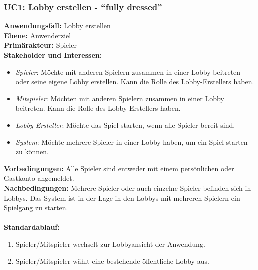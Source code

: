 \documentclass[11pt,ngerman]{article}
\newcommand{\quotes}[1]{``#1''}
\begin{document}
       \subsubsection{UC1: Lobby erstellen - \quotes{fully dressed}}
            \begin{tcolorbox}[enhanced, breakable, sharp corners, width=\dimexpr\textwidth-15mm\relax ,enlarge left by=10mm ,fontupper=\linespread{1.1}\selectfont, boxrule=1pt, title={UC1: Lobby erstellen}, colback=white, colframe=gray!22, coltitle=black]

                \textbf{Anwendungsfall:} Lobby erstellen \\
                \textbf{Ebene:} Anwenderziel \\
                \textbf{Primärakteur:} Spieler \\
                \textbf{Stakeholder und Interessen:}
                \begin{itemize}
                    \item \textit{Spieler}: Möchte mit anderen Spielern zusammen in einer \Gls{Lobby} beitreten oder seine eigene \Gls{Lobby} erstellen. Kann die Rolle des Lobby-Erstellers haben.
                    \item \textit{Mitspieler}: Möchten mit anderen Spielern zusammen in einer \Gls{Lobby} beitreten. Kann die Rolle des Lobby-Erstellers haben.
                    \item \textit{Lobby-Ersteller}:  Möchte das Spiel starten, wenn alle Spieler bereit sind.
                    \item \textit{System}: Möchte mehrere Spieler in einer \Gls{Lobby} haben, um ein Spiel starten zu können.
                \end{itemize}
                \textbf{Vorbedingungen:} Alle Spieler sind entweder mit einem persönlichen oder Gastkonto angemeldet.\\
                \textbf{Nachbedingungen:} Mehrere Spieler oder auch einzelne Spieler befinden sich in \Glspl{Lobby}. Das System ist in der Lage in den \Glspl{Lobby} mit mehreren Spielern ein Spielgang zu starten. \\
                \\  \textbf{Standardablauf:}
                \begin{enumerate}
                    \item Spieler/Mitspieler wechselt zur Lobbyansicht der Anwendung.
                    \item Spieler/Mitspieler wählt eine bestehende öffentliche \Gls{Lobby} aus.

\end{enumerate}
\end{tcolorbox}
\end{document}
